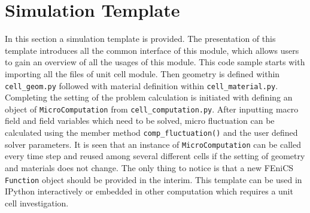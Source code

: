 \section{Simulation Template}
In this section a simulation template is provided. The presentation of this template introduces all the common interface of this module, which allows users to gain an overview of all the usages of this module. This code sample starts with importing all the files of unit cell module. Then geometry is defined within \texttt{cell\_geom.py} followed with material definition within \texttt{cell\_material.py}. Completing the setting of the problem calculation is initiated with defining an object of \texttt{MicroComputation} from \texttt{cell\_computation.py}. After inputting macro field and field variables which need to be solved, micro fluctuation can be calculated using the member method \texttt{comp\_fluctuation()} and the user defined solver parameters. It is seen that an instance of \texttt{MicroComputation} can be called every time step and reused among several different cells if the setting of geometry and materials does not change. The only thing to notice is that a new FEniCS \texttt{Function} object should be provided in the interim. This template can be used in IPython interactively or embedded in other computation which requires a unit cell investigation.

